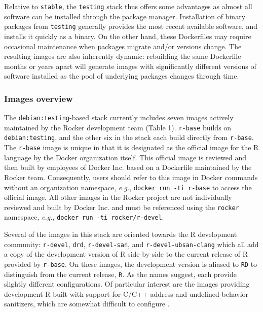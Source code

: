 Relative to \texttt{stable}, the \texttt{testing} stack thus offers some
advantages as almost all software can be installed through the package
manager. Installation of binary packages from \texttt{testing} generally
provides the most recent available software, and installs it quickly as
a binary. On the other hand, these Dockerfiles may require occasional
maintenance when packages migrate and/or versions change. The resulting
images are also inherently dynamic: rebuilding the same Dockerfile
months or years apart will generate images with significantly different
versions of software installed as the pool of underlying packages
changes through time.

\subsubsection{Images overview}\label{images-overview}

The \texttt{debian:testing}-based stack currently includes seven images
actively maintained by the Rocker development team (Table 1).
\texttt{r-base} builds on \texttt{debian:testing}, and the other six in
the stack each build directly from \texttt{r-base}. The \texttt{r-base}
image is unique in that it is designated as the official image for the R
language by the Docker organization itself. This official image is
reviewed and then built by employees of Docker Inc. based on a
Dockerfile maintained by the Rocker team. Consequently, users should
refer to this image in Docker commands without an organization
namespace, \emph{e.g.}, \texttt{docker\ run\ -ti\ r-base} to access the
official image. All other images in the Rocker project are not
individually reviewed and built by Docker Inc. and must be referenced
using the \texttt{rocker} namespace, \emph{e.g.},
\texttt{docker\ run\ -ti\ rocker/r-devel}.

Several of the images in this stack are oriented towards the R
development community: \texttt{r-devel}, \texttt{drd},
\texttt{r-devel-san}, and \texttt{r-devel-ubsan-clang} which all add a
copy of the development version of R side-by-side to the current release
of R provided by \texttt{r-base}. On these images, the development
version is aliased to \texttt{RD} to distinguish from the current
release, \texttt{R}. As the names suggest, each provide slightly
different configurations. Of particular interest are the images
providing development R built with support for C/C++ address and
undefined-behavior sanitizers, which are somewhat difficult to configure
\citep{edd_sanitizers}.

